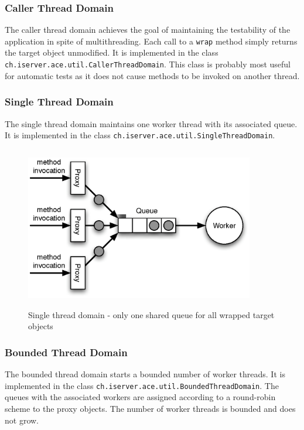 \subsubsection{Caller Thread Domain}
The caller thread domain achieves the goal of maintaining the testability
of the application in spite of multithreading. Each call to a
\texttt{wrap} method simply returns the target object unmodified. It
is implemented in the class \texttt{ch.iserver.ace.util.CallerThreadDomain}.
This class is probably most useful for automatic tests as it does not cause
methods to be invoked on another thread.

\subsubsection{Single Thread Domain}
The single thread domain maintains one worker thread with its associated
queue. It is implemented in the class
\texttt{ch.iserver.ace.util.SingleThreadDomain}.

\begin{figure}[H]
 \centering
 \includegraphics[width=10cm,height=7.1cm]{../images/finalreport/threaddomain_single.eps}
 \caption{Single thread domain - only one shared queue for all wrapped target objects}
\end{figure}

\subsubsection{Bounded Thread Domain}
The bounded thread domain starts a bounded number of worker threads. It
is implemented in the class \texttt{ch.iserver.ace.util.BoundedThreadDomain}.
The queues with the associated workers are assigned according to
a round-robin scheme to the proxy objects. The number of worker threads
is bounded and does not grow.

